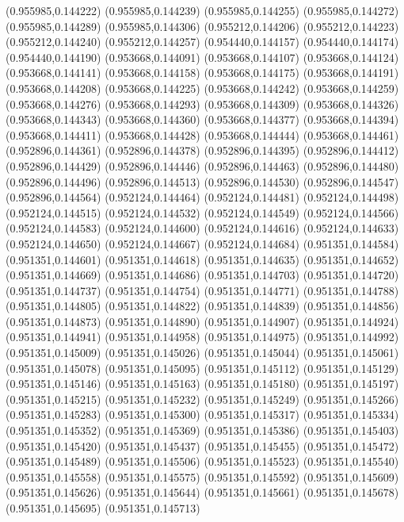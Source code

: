 (0.955985,0.144222)
(0.955985,0.144239)
(0.955985,0.144255)
(0.955985,0.144272)
(0.955985,0.144289)
(0.955985,0.144306)
(0.955212,0.144206)
(0.955212,0.144223)
(0.955212,0.144240)
(0.955212,0.144257)
(0.954440,0.144157)
(0.954440,0.144174)
(0.954440,0.144190)
(0.953668,0.144091)
(0.953668,0.144107)
(0.953668,0.144124)
(0.953668,0.144141)
(0.953668,0.144158)
(0.953668,0.144175)
(0.953668,0.144191)
(0.953668,0.144208)
(0.953668,0.144225)
(0.953668,0.144242)
(0.953668,0.144259)
(0.953668,0.144276)
(0.953668,0.144293)
(0.953668,0.144309)
(0.953668,0.144326)
(0.953668,0.144343)
(0.953668,0.144360)
(0.953668,0.144377)
(0.953668,0.144394)
(0.953668,0.144411)
(0.953668,0.144428)
(0.953668,0.144444)
(0.953668,0.144461)
(0.952896,0.144361)
(0.952896,0.144378)
(0.952896,0.144395)
(0.952896,0.144412)
(0.952896,0.144429)
(0.952896,0.144446)
(0.952896,0.144463)
(0.952896,0.144480)
(0.952896,0.144496)
(0.952896,0.144513)
(0.952896,0.144530)
(0.952896,0.144547)
(0.952896,0.144564)
(0.952124,0.144464)
(0.952124,0.144481)
(0.952124,0.144498)
(0.952124,0.144515)
(0.952124,0.144532)
(0.952124,0.144549)
(0.952124,0.144566)
(0.952124,0.144583)
(0.952124,0.144600)
(0.952124,0.144616)
(0.952124,0.144633)
(0.952124,0.144650)
(0.952124,0.144667)
(0.952124,0.144684)
(0.951351,0.144584)
(0.951351,0.144601)
(0.951351,0.144618)
(0.951351,0.144635)
(0.951351,0.144652)
(0.951351,0.144669)
(0.951351,0.144686)
(0.951351,0.144703)
(0.951351,0.144720)
(0.951351,0.144737)
(0.951351,0.144754)
(0.951351,0.144771)
(0.951351,0.144788)
(0.951351,0.144805)
(0.951351,0.144822)
(0.951351,0.144839)
(0.951351,0.144856)
(0.951351,0.144873)
(0.951351,0.144890)
(0.951351,0.144907)
(0.951351,0.144924)
(0.951351,0.144941)
(0.951351,0.144958)
(0.951351,0.144975)
(0.951351,0.144992)
(0.951351,0.145009)
(0.951351,0.145026)
(0.951351,0.145044)
(0.951351,0.145061)
(0.951351,0.145078)
(0.951351,0.145095)
(0.951351,0.145112)
(0.951351,0.145129)
(0.951351,0.145146)
(0.951351,0.145163)
(0.951351,0.145180)
(0.951351,0.145197)
(0.951351,0.145215)
(0.951351,0.145232)
(0.951351,0.145249)
(0.951351,0.145266)
(0.951351,0.145283)
(0.951351,0.145300)
(0.951351,0.145317)
(0.951351,0.145334)
(0.951351,0.145352)
(0.951351,0.145369)
(0.951351,0.145386)
(0.951351,0.145403)
(0.951351,0.145420)
(0.951351,0.145437)
(0.951351,0.145455)
(0.951351,0.145472)
(0.951351,0.145489)
(0.951351,0.145506)
(0.951351,0.145523)
(0.951351,0.145540)
(0.951351,0.145558)
(0.951351,0.145575)
(0.951351,0.145592)
(0.951351,0.145609)
(0.951351,0.145626)
(0.951351,0.145644)
(0.951351,0.145661)
(0.951351,0.145678)
(0.951351,0.145695)
(0.951351,0.145713)
